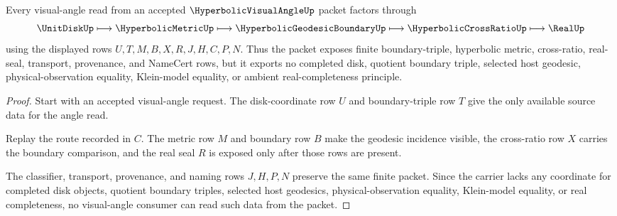 \begin{theorem}
\label{thm:hyperbolic-visual-angle-route-nonescape}
Every visual-angle read from an accepted $\HyperbolicVisualAngleUp$ packet factors through
$$
\UnitDiskUp \longmapsto \HyperbolicMetricUp \longmapsto \HyperbolicGeodesicBoundaryUp \longmapsto \HyperbolicCrossRatioUp \longmapsto \RealUp
$$
using the displayed rows $U,T,M,B,X,R,J,H,C,P,N$. Thus the packet exposes finite boundary-triple, hyperbolic metric, cross-ratio, real-seal, transport, provenance, and NameCert rows, but it exports no completed disk, quotient boundary triple, selected host geodesic, physical-observation equality, Klein-model equality, or ambient real-completeness principle.
\end{theorem}
\begin{proof}
Start with an accepted visual-angle request. The disk-coordinate row $U$ and boundary-triple row $T$ give the only available source data for the angle read.

Replay the route recorded in $C$. The metric row $M$ and boundary row $B$ make the geodesic incidence visible, the cross-ratio row $X$ carries the boundary comparison, and the real seal $R$ is exposed only after those rows are present.

The classifier, transport, provenance, and naming rows $J,H,P,N$ preserve the same finite packet. Since the carrier lacks any coordinate for completed disk objects, quotient boundary triples, selected host geodesics, physical-observation equality, Klein-model equality, or real completeness, no visual-angle consumer can read such data from the packet.
\end{proof}



